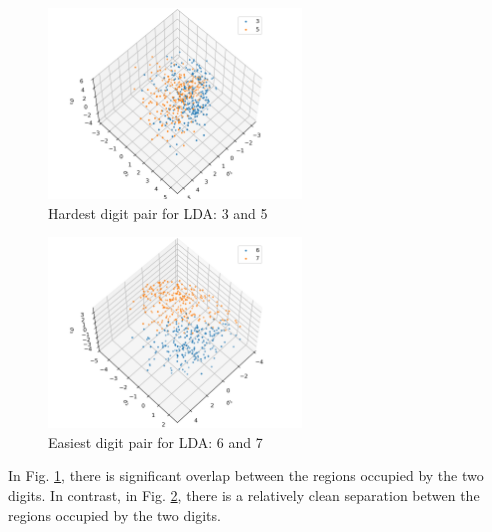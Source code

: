 \documentclass[11pt]{article}
\begin{document}
\subsection{}  %
\begin{figure}[H]
    \centering
    \includegraphics[width=0.6\textwidth]{2.5fig1.png}
    \caption{Hardest digit pair for LDA: 3 and 5}
    \label{fig_2.5_1}
\end{figure}
\begin{figure}[H]
    \centering
    \includegraphics[width=0.6\textwidth]{2.5fig2.png}
    \caption{Easiest digit pair for LDA: 6 and 7}
    \label{fig_2.5_2}
\end{figure}

In Fig. \ref{fig_2.5_1}, there is significant overlap between the regions
occupied by the two digits. In contrast, in Fig. \ref{fig_2.5_2}, there is
a relatively clean separation betwen the regions occupied by the two digits.
\end{document}
